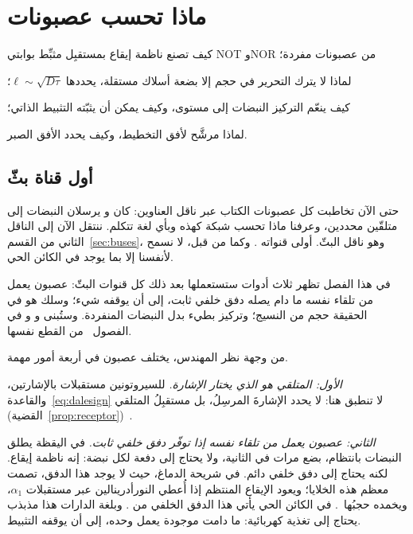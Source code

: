 \chapter{ماذا تحسب عصبونات }
\label{sec:serocomputer}
\begin{chaptergoals}
\item كيف تصنع ناظمة إيقاع بمستقبِل مثبِّط بوابتي \foreignlanguage{english}{NOT} و\foreignlanguage{english}{NOR} من عصبونات  مفردة؛
\item لماذا لا يترك التحرير في حجم إلا بضعة أسلاك مستقلة، يحددها $\ell\sim\sqrt{D\tau}$؛
\item كيف ينعّم التركيز النبضات إلى مستوى، وكيف يمكن أن يثبّته التثبيط الذاتي؛
\item لماذا  مرشَّح لأفق التخطيط، وكيف يحدد الأفق الصبر.
\end{chaptergoals}

\section{أول قناة بثّ}

حتى الآن تخاطبت كل عصبونات الكتاب عبر ناقل العناوين: كان  و يرسلان النبضات إلى متلقّين محددين، وعرفنا ماذا تحسب شبكة كهذه وبأي لغة تتكلم. ننتقل الآن إلى الناقل الثاني من القسم~\ref{sec:buses}، وهو ناقل البثّ. أولى قنواته . وكما من قبل، لا نسمح لأنفسنا إلا بما يوجد في الكائن الحي.

في هذا الفصل تظهر ثلاث أدوات ستستعملها بعد ذلك كل قنوات البثّ: عصبون يعمل من تلقاء نفسه ما دام يصله دفق خلفي ثابت، إلى أن يوقفه شيء؛ وسلك هو في الحقيقة حجم من النسيج؛ وتركيز بطيء بدل النبضات المنفردة. وستُبنى  و و في الفصول~\babelsublr{\ref{sec:dofa}--\ref{sec:acet}} من القطع نفسها.

من وجهة نظر المهندس، يختلف عصبون  في أربعة أمور مهمة.

\emph{الأول: المتلقي هو الذي يختار الإشارة.} للسيروتونين مستقبلات بالإشارتين، والقاعدة~\eqref{eq:dalesign} لا تنطبق هنا: لا يحدد الإشارةَ المرسِلُ، بل مستقبِلُ المتلقي (القضية~\ref{prop:receptor})~\cite{BarnesSharp1999}.

\emph{الثاني: عصبون  يعمل من تلقاء نفسه إذا توفّر دفق خلفي ثابت.} في اليقظة يطلق النبضات بانتظام، بضع مرات في الثانية، ولا يحتاج إلى دفعة لكل نبضة: إنه ناظمة إيقاع. لكنه يحتاج إلى دفق خلفي دائم. في شريحة الدماغ، حيث لا يوجد هذا الدفق، تصمت معظم هذه الخلايا؛ ويعود الإيقاع المنتظم إذا أُعطي النورأدرينالين عبر مستقبلات $\alpha_1$، ويخمده حجبُها~\cite{VandermaelenAghajanian1983}. في الكائن الحي يأتي هذا الدفق الخلفي من . وبلغة الدارات هذا مذبذب يحتاج إلى تغذية كهربائية: ما دامت موجودة يعمل وحده، إلى أن يوقفه التثبيط.

